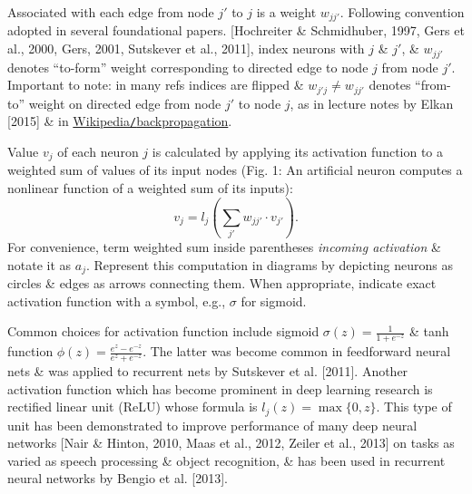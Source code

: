 \documentclass{article}
\begin{document}
\begin{enumerate}
\begin{itemize}
\begin{itemize}
			Associated with each edge from node $j'$ to $j$ is a weight $w_{jj'}$. Following convention adopted in several foundational papers. [Hochreiter \& Schmidhuber, 1997, Gers et al., 2000, Gers, 2001, Sutskever et al., 2011], index neurons with $j$ \& $j'$, \& $w_{jj'}$ denotes ``to-form'' weight corresponding to directed edge to node $j$ from node $j'$. Important to note: in many refs indices are flipped \& $w_{j'j}\ne w_{jj'}$ denotes ``from-to'' weight on directed edge from node $j'$ to node $j$, as in lecture notes by Elkan [2015] \& in \href{http://en.wikipedia.org/wiki/Backpropagation}{Wikipedia{\tt/}backpropagation}.
			
			Value $v_j$ of each neuron $j$ is calculated by applying its activation function to a weighted sum of values of its input nodes ({\sf Fig. 1: An artificial neuron computes a nonlinear function of a weighted sum of its inputs}):
			\begin{equation}
				v_j = l_j\left(\sum_{j'} w_{jj'}\cdot v_{j'}\right).
			\end{equation}
			For convenience, term weighted sum inside parentheses {\it incoming activation} \& notate it as $a_j$. Represent this computation in diagrams by depicting neurons as circles \& edges as arrows connecting them. When appropriate, indicate exact activation function with a symbol, e.g., $\sigma$ for sigmoid.
			
			Common choices for activation function include sigmoid $\sigma(z) = \frac{1}{1 + e^{-z}}$ \& tanh function $\phi(z) = \frac{e^z - e^{-z}}{e^z + e^{-z}}$. The latter was become common in feedforward neural nets \& was applied to recurrent nets by Sutskever et al. [2011]. Another activation function which has become prominent in deep learning research is rectified linear unit (ReLU) whose formula is $l_j(z) = \max\{0,z\}$. This type of unit has been demonstrated to improve performance of many deep neural networks [Nair \& Hinton, 2010, Maas et al., 2012, Zeiler et al., 2013] on tasks as varied as speech processing \& object recognition, \& has been used in recurrent neural networks by Bengio et al. [2013].
			

\end{itemize}
\end{itemize}
\end{enumerate}
\end{document}
